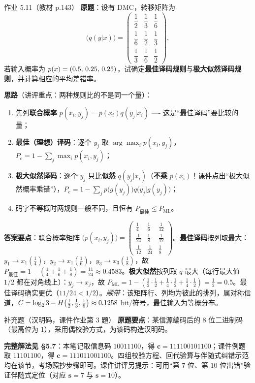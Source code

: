 \begin{example}{作业 5.11（教材 p.143）}
\textbf{原题}：设有 DMC，转移矩阵为
\begin{equation*}
\bigl(q(y|x)\bigr)=\begin{pmatrix}
\dfrac12&\dfrac13&\dfrac16\\[4pt]
\dfrac16&\dfrac12&\dfrac13\\[4pt]
\dfrac13&\dfrac16&\dfrac12
\end{pmatrix},
\end{equation*}
若输入概率为 $p\!\left(x\right)=(0.5,\,0.25,\,0.25)$，试确定\textbf{最佳译码规则}与\textbf{极大似然译码规则}，并计算相应的平均差错率。

\textbf{思路}（讲评重点：两种规则比的不是同一个量）：
\begin{enumerate}[leftmargin=1.4em,itemsep=1pt,topsep=2pt]
  \item 先列\textbf{联合概率} $p(x_i,y_j)=p(x_i)q(y_j|x_i)$ ---- 这是“最佳译码”要比较的量；
  \item \textbf{最佳（理想）译码}：逐个 $y_j$ 取 $\arg\max_i p(x_i,y_j)$，$P_e=1-\sum_j\max_ip(x_i,y_j)$；
  \item \textbf{极大似然译码}：逐个 $y_j$ 只比\textbf{似然} $q(y_j|x_i)$（\textbf{不乘} $p(x_i)$！课件点出“极大似然概率乘错”），$P_e=1-\sum_jp\bigl(g(y_j)\bigr)q\bigl(y_j|g(y_j)\bigr)$；
  \item 码字不等概时两规则一般不同，且恒有 $P_{\text{最佳}}\le P_{\text{ML}}$。
\end{enumerate}
\textbf{答案要点}：联合概率矩阵
$\bigl(p(x_i,y_j)\bigr)=\begin{pmatrix}\frac14&\frac16&\frac1{12}\\[2pt]\frac1{24}&\frac18&\frac1{12}\\[2pt]\frac1{12}&\frac1{24}&\frac18\end{pmatrix}$。\textbf{最佳译码}按列取最大：$y_1\to x_1(\frac14)$，$y_2\to x_1(\frac16)$，$y_3\to x_3(\frac18)$，故 $P_{\text{最佳}}=1-(\frac14+\frac16+\frac18)=\frac{11}{24}\approx0.4583$。\textbf{极大似然}按列取 $q$ 最大（每行最大值 $1/2$ 都在对角线上）：$y_j\to x_j$，故 $P_{\text{ML}}=1-(\frac12\cdot\frac12+\frac14\cdot\frac12+\frac14\cdot\frac12)=\frac12=0.5$。最佳译码确实更优（$11/24<1/2$）。\emph{顺带}：该矩阵行、列均为彼此的排列，属对称信道，$C=\log_{2}3-H\!\left(\frac12,\frac13,\frac16\right)\approx0.1258$ bit/符号，最佳输入为等概分布。
\end{example}

\begin{example}{补充题（汉明码，课件作业第 3 题）}
\textbf{原题要点}：某信源编码后的 8 位二进制码（最高位为 1），采用偶校验方式，为该码构造汉明码。

\textbf{完整解法见 \S5.7}：本笔记取信息码 $10011100$，得 $\mathbf{c}=111100101100$；课件例题取 $11101100$，得 $\mathbf{c}=111011001100$。四组校验方程、回代验算与伴随式纠错示范均在该节，考场照抄步骤即可。课件讲评另提示：可用“第 $7$ 位、第 $10$ 位出错”验证伴随式定位（对应 $\mathbf{s}=7$ 与 $\mathbf{s}=10$）。
\end{example}

